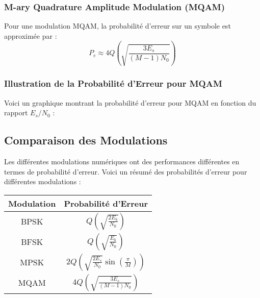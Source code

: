 \documentclass[10pt,a4paper]{article}
\begin{document}
\subsubsection*{M-ary Quadrature Amplitude Modulation (MQAM)}
Pour une modulation MQAM, la probabilité d'erreur sur un symbole est approximée par :
\[ P_e \approx 4Q\left(\sqrt{\frac{3E_s}{(M-1)N_0}}\right) \]

\subsubsection*{Illustration de la Probabilité d'Erreur pour MQAM}
Voici un graphique montrant la probabilité d'erreur pour MQAM en fonction du rapport \( E_s/N_0 \) :


\subsection*{Comparaison des Modulations}
Les différentes modulations numériques ont des performances différentes en termes de probabilité d'erreur. Voici un résumé des probabilités d'erreur pour différentes modulations :

\begin{tabular}{|c|c|}
\hline
Modulation & Probabilité d'Erreur \\
\hline
BPSK & \( Q\left(\sqrt{\frac{2E_b}{N_0}}\right) \) \\
\hline
BFSK & \( Q\left(\sqrt{\frac{E_b}{N_0}}\right) \) \\
\hline
MPSK & \( 2Q\left(\sqrt{\frac{2E_s}{N_0}} \sin\left(\frac{\pi}{M}\right)\right) \) \\
\hline
MQAM & \( 4Q\left(\sqrt{\frac{3E_s}{(M-1)N_0}}\right) \) \\
\hline
\end{tabular}
\end{document}

